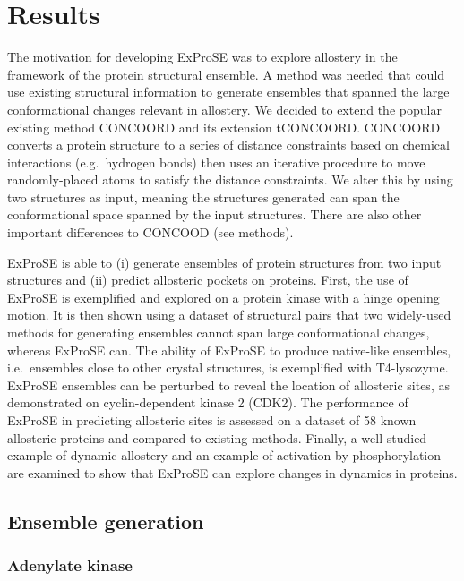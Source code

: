\section{Results}
\label{sec:exprose_results}

The motivation for developing ExProSE was to explore allostery in the framework of the protein structural ensemble.
A method was needed that could use existing structural information to generate ensembles that spanned the large conformational changes relevant in allostery.
We decided to extend the popular existing method CONCOORD and its extension tCONCOORD.
CONCOORD converts a protein structure to a series of distance constraints based on chemical interactions (e.g.\ hydrogen bonds) then uses an iterative procedure to move randomly-placed atoms to satisfy the distance constraints.
We alter this by using two structures as input, meaning the structures generated can span the conformational space spanned by the input structures.
There are also other important differences to CONCOOD (see methods).

ExProSE is able to (i) generate ensembles of protein structures from two input structures and (ii) predict allosteric pockets on proteins.
First, the use of ExProSE is exemplified and explored on a protein kinase with a hinge opening motion.
It is then shown using a dataset of structural pairs that two widely-used methods for generating ensembles cannot span large conformational changes, whereas ExProSE can.
The ability of ExProSE to produce native-like ensembles, i.e.\ ensembles close to other crystal structures, is exemplified with T4-lysozyme.
ExProSE ensembles can be perturbed to reveal the location of allosteric sites, as demonstrated on cyclin-dependent kinase 2 (CDK2).
The performance of ExProSE in predicting allosteric sites is assessed on a dataset of 58 known allosteric proteins and compared to existing methods.
Finally, a well-studied example of dynamic allostery and an example of activation by phosphorylation are examined to show that ExProSE can explore changes in dynamics in proteins.


\subsection{Ensemble generation}

\subsubsection{Adenylate kinase}


